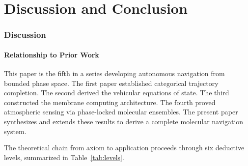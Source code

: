 \documentclass[11pt,twocolumn,a4paper]{article}
\theoremstyle{plain}
\theoremstyle{definition}
\theoremstyle{remark}
\begin{document}

\part{Discussion and Conclusion}
\label{part:discussion}

\section{Discussion}
\label{sec:discussion}

\subsection{Relationship to Prior Work}

This paper is the fifth in a series developing autonomous navigation from bounded phase space. The first paper \cite{sachikonye2026trajectory} established categorical trajectory completion. The second \cite{sachikonye2026equations} derived the vehicular equations of state. The third \cite{sachikonye2026membrane} constructed the membrane computing architecture. The fourth \cite{sachikonye2026gas} proved atmospheric sensing via phase-locked molecular ensembles. The present paper synthesizes and extends these results to derive a complete molecular navigation system.

The theoretical chain from axiom to application proceeds through six deductive levels, summarized in Table~\ref{tab:levels}.
\end{document}
